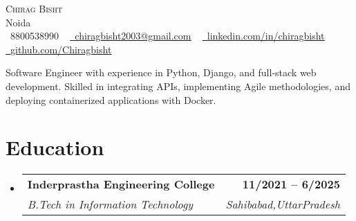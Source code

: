 \documentclass[letterpaper,11pt]{article}
\makeatletter
\newcommand{\resumeSubheading}[4]{
  \vspace{-2pt}\item
    \begin{tabular*}{1.0\textwidth}[t]{l@{\extracolsep{\fill}}r}
      \textbf{#1} & \textbf{\small #2} \\
      \textit{\small#3} & \textit{\small #4} \\
    \end{tabular*}\vspace{-7pt}
}
\newcommand{\resumeSubHeadingListStart}{\begin{itemize}[leftmargin=0.0in, label={}]}
\newcommand{\resumeSubHeadingListEnd}{\end{itemize}}
\makeatother
\begin{document}

\begin{center}
    {\Huge \scshape Chirag Bisht} \\ \vspace{3pt}
    Noida \\ \vspace{3pt}
    \small \raisebox{-0.1\height}\faPhone\ 8800538990 ~ \href{mailto:chiragbisht2003@gmail.com}{\raisebox{-0.2\height}\faEnvelope\  \underline{chiragbisht2003@gmail.com}} ~ 
    \href{https://www.linkedin.com/in/chiragbisht/}{\raisebox{-0.2\height}\faLinkedin\ \underline{linkedin.com/in/chiragbisht}}  ~
    \href{https://github.com/Chiragbisht}{\raisebox{-0.2\height}\faGithub\ \underline{github.com/Chiragbisht}}
    \vspace{-2pt}
\end{center}

\begin{itemize}[leftmargin=0.15in, label={}]
    \small{\item{
    Software Engineer with experience in Python, Django, and full-stack web development. Skilled in integrating APIs, implementing Agile methodologies, and deploying containerized applications with Docker.
    }}
\end{itemize}
\vspace{-10pt}



\section{Education}
  \resumeSubHeadingListStart
    \resumeSubheading
      {Inderprastha Engineering College}{11/2021 -- 6/2025}
      {B.Tech in Information Technology}{Sahibabad,UttarPradesh}
  \resumeSubHeadingListEnd

\end{document}
